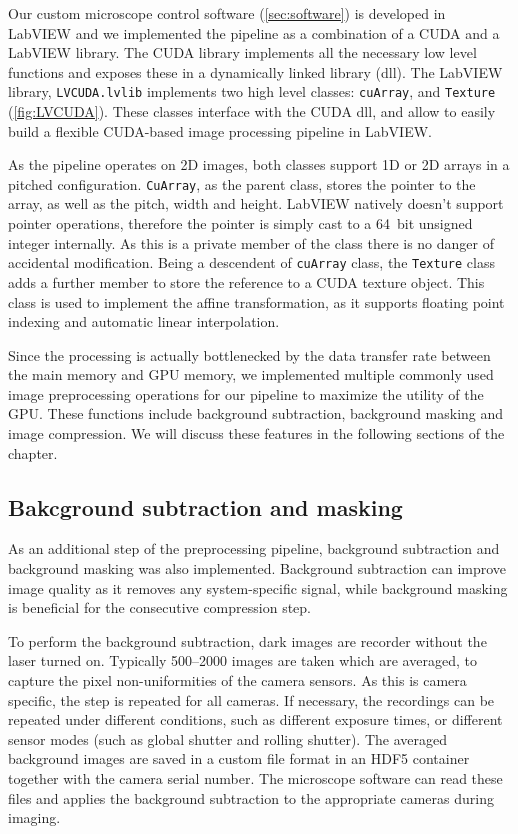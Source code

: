   Our custom microscope control software (\autoref{sec:software}) is developed in LabVIEW and we implemented the pipeline as a combination of a CUDA and a LabVIEW library. The CUDA library implements all the necessary low level functions and exposes these in a dynamically linked library (dll). The LabVIEW library, \texttt{LVCUDA.lvlib} implements two high level classes: \texttt{cuArray}, and \texttt{Texture} (\autoref{fig:LVCUDA}). These classes interface with the CUDA dll, and allow to easily build a flexible CUDA-based image processing pipeline in LabVIEW.

  As the pipeline operates on 2D images, both classes support 1D or 2D arrays in a pitched configuration. \texttt{CuArray}, as the parent class, stores the pointer to the array, as well as the pitch, width and height. LabVIEW natively doesn't support pointer operations, therefore the pointer is simply cast to a \SI{64}{bit} unsigned integer internally. As this is a private member of the class there is no danger of accidental modification. Being a descendent of \texttt{cuArray} class, the \texttt{Texture} class adds a further member to store the reference to a CUDA texture object. This class is used to implement the affine transformation, as it supports floating point indexing and automatic linear interpolation.

  Since the processing is actually bottlenecked by the data transfer rate between the main memory and GPU memory, we implemented multiple commonly used image preprocessing operations for our pipeline to maximize the utility of the GPU. These functions include background subtraction, background masking and image compression. We will discuss these features in the following sections of the chapter. 

  \subsection{Bakcground subtraction and masking}
  As an additional step of the preprocessing pipeline, background subtraction and background masking was also implemented. Background subtraction can improve image quality as it removes any system-specific signal, while background masking is beneficial for the consecutive compression step.

  To perform the background subtraction, dark images are recorder without the laser turned on. Typically 500--2000 images are taken which are averaged, to capture the pixel non-uniformities of the camera sensors. As this is camera specific, the step is repeated for all cameras. If necessary, the recordings can be repeated under different conditions, such as different exposure times, or different sensor modes (such as global shutter and rolling shutter). The averaged background images are saved in a custom file format in an HDF5 container \cite{the_hdf_group_hierarchical_1997} together with the camera serial number. The microscope software can read these files and applies the background subtraction to the appropriate cameras during imaging.

